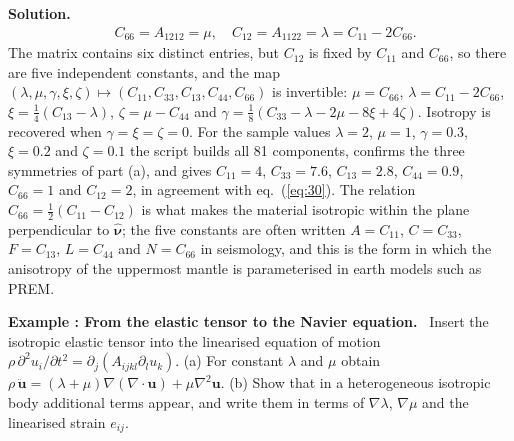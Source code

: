 \documentclass[a4paper,12pt]{paper}
\newcounter{example}
\renewenvironment{example}[1]{%
  \refstepcounter{example}%
  \begin{mdframed}[linewidth=1pt,innertopmargin=6pt,innerbottommargin=6pt]%
  \noindent\textbf{Example \theexample: #1.}\ }{%
  \end{mdframed}}
\newenvironment{solution}{\par\noindent\textbf{Solution.}\ }{\par\medskip}
\begin{document}
\begin{solution}
\begin{equation}
\begin{split}
&C_{66}=A_{1212}=\mu,\quad C_{12}=A_{1122}=\lambda=C_{11}-2C_{66}.
\end{split}
\label{eq:30}
\end{equation}
The matrix contains six distinct entries, but $C_{12}$ is fixed by $C_{11}$ and $C_{66}$, so there
are five independent constants, and the map
$(\lambda,\mu,\gamma,\xi,\zeta)\mapsto(C_{11},C_{33},C_{13},C_{44},C_{66})$ is invertible:
$\mu=C_{66}$, $\lambda=C_{11}-2C_{66}$, $\xi=\frac{1}{4}(C_{13}-\lambda)$, $\zeta=\mu-C_{44}$ and
$\gamma=\frac{1}{8}(C_{33}-\lambda-2\mu-8\xi+4\zeta)$. Isotropy is recovered when
$\gamma=\xi=\zeta=0$. For the sample values $\lambda=2$, $\mu=1$, $\gamma=0.3$, $\xi=0.2$ and
$\zeta=0.1$ the script builds all 81 components, confirms the three symmetries of part (a), and
gives $C_{11}=4$, $C_{33}=7.6$, $C_{13}=2.8$, $C_{44}=0.9$, $C_{66}=1$ and $C_{12}=2$, in agreement
with eq.~(\ref{eq:30}). The relation $C_{66}=\frac{1}{2}(C_{11}-C_{12})$ is what makes
the material isotropic within the plane perpendicular to $\hat{\bm{\nu}}$; the five constants are
often written $A=C_{11}$, $C=C_{33}$, $F=C_{13}$, $L=C_{44}$ and $N=C_{66}$ in seismology, and this
is the form in which the anisotropy of the uppermost mantle is parameterised in earth models such as
PREM.
\end{solution}

\begin{example}{From the elastic tensor to the Navier equation}
Insert the isotropic elastic tensor into the linearised equation of motion
$\rho\,\partial^{2}u_{i}/\partial t^{2}=\partial_{j}(A_{ijkl}\partial_{l}u_{k})$. (a) For constant
$\lambda$ and $\mu$ obtain
$\rho\,\ddot{\mathbf{u}}=(\lambda+\mu)\nabla(\nabla\cdot\mathbf{u})+\mu\nabla^{2}\mathbf{u}$.
(b) Show that in a heterogeneous isotropic body additional terms appear, and write them in terms
of $\nabla\lambda$, $\nabla\mu$ and the linearised strain $e_{ij}$.
\end{example}
\end{document}

